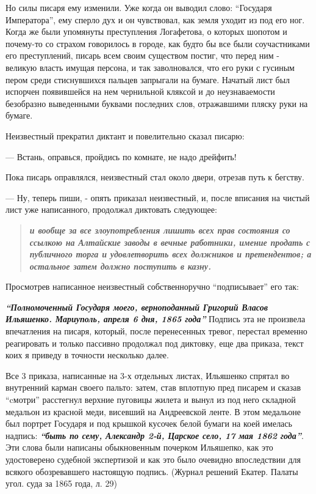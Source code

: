 \documentclass[a4paper,20pt]{report}
\begin{document}

Но силы писаря ему изменили. Уже когда он выводил слово: \enquote{Государя
Императора}, ему сперло дух и он чувствовал, как земля уходит из под его ног.
Когда же были упомянуты преступления Логафетова, о которых шопотом и почему-то
со страхом говорилось в городе, как будто бы все были соучастниками его
преступлений, писарь всем своим существом постиг, что перед ним - великую
власть имущая персона, и так заволновался, что его руки с гусиным пером среди
стиснувшихся пальцев запрыгали на бумаге. Начатый лист был испорчен появившейся
на нем чернильной кляксой и до неузнаваемости безобразно выведенными буквами
последних слов, отражавшими пляску руки на бумаге.

Неизвестный прекратил диктант и повелительно сказал писарю:

— Встань, оправься, пройдись по комнате, не надо дрейфить!

Пока писарь оправлялся, неизвестный стал около двери, отрезав путь к бегству. 

— Ну, теперь пиши, - опять приказал неизвестный, и, после вписания на чистый
лист уже написанного, продолжал диктовать следующее:
\begin{quote}
\em\bfseries
и вообще за все злоупотребления лишить всех прав состояния со ссылкою на Алтайские заводы 
в вечные работники, имение продать с публичного торга и удовлетворить всех должников и претендентов; а остальное затем
должно поступить в казну.
\end{quote}

Просмотрев написанное неизвестный собственноручно ``подписывает'' его так: 

\textbf{\em ``Полномоченный Государя моего, верноподанный Григорий Власов Ильяшенко. Мариуполь, апреля 6 дня, 1865 года''}
Подпись эта не произвела впечатления
на писаря, который, после перенесенных тревог, перестал временно реагировать и
только пассивно продолжал под диктовку, еще два приказа, текст коих я приведу в
точности несколько далее.

Все 3 приказа, написанные на 3-х отдельных листах, Ильяшенко спрятал во
внутренний карман своего пальто: затем, став вплотпую пред писарем и сказав
``cмотри'' расстегнул верхние пуговицы жилета и вынул из под него складной
медальон из красной меди, висевший на Андреевской ленте.  В этом медальоне был
портрет Государя и под крышкой кусочек белой бумаги на коей имелась надпись:
\textbf{\em ``быть по сему, Александр 2-й, Царское село, 17 мая 1862 года''}.
Эти слова были написаны обыкновенным почерком Ильяшепко, как это удостоверено
судебной экспертизой и как это было очевидно впоследствии для всякого
обозревавшего настоящую подпись. (Журнал решений Екатер. Палаты угол. суда за
1865 года, л. 29)
\end{document}
